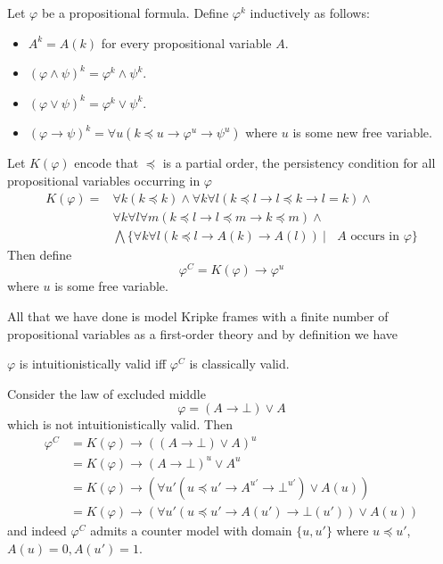 \documentclass[a4paper,UKenglish,cleveref, autoref, thm-restate]{lipics-v2021}
\begin{document}
\begin{definition}
	Let $\varphi$ be a propositional formula. Define $\varphi^{k}$ inductively as follows:
	\begin{itemize}
		\item $A^{k} = A(k)$ for every propositional variable $A$.
		\item $(\varphi\wedge\psi)^k = \varphi^k\wedge\psi^k$.
		\item $(\varphi\vee\psi)^k = \varphi^k\vee\psi^k$.
		\item $(\varphi\to \psi)^k = \forall u(k\preceq u\to\varphi^{u}\to\psi^{u})$ where $u$ is some new free variable.
	\end{itemize}
	Let $K(\varphi)$ encode that $\preceq$ is a partial order, the persistency condition for all propositional variables occurring in $\varphi$
	\begin{align*}
		K(\varphi) = &\forall k(k\preceq k)\wedge \forall k\forall l(k\preceq l\to l\preceq k\to l = k) \wedge \\&\forall k\forall l\forall m(k\preceq l \to l\preceq m\to k\preceq m)\wedge\\&\bigwedge \{\forall k\forall l(k\preceq l\to A(k)\to A(l))\:|\: \text{ $A$ occurs in $\varphi$}\}
	\end{align*}
	Then define
	$$\varphi^{C} = K(\varphi)\to \varphi^{u}$$
	where $u$ is some free variable.
\end{definition}

All that we have done is model Kripke frames with a finite number of propositional variables as a first-order theory and by definition we have

\begin{lemma}
	$\varphi$ is intuitionistically valid iff $\varphi^C$ is classically valid.
\end{lemma}

\begin{example}
	Consider the law of excluded middle $$\varphi = (A\to \bot)\vee A$$ which is not intuitionistically valid. Then
	\begin{align*}
		\varphi^{C} &= K(\varphi)\to ((A\to \bot)\vee A)^u\\
		&= K(\varphi)\to (A\to \bot)^u\vee A^u\\
		&= K(\varphi)\to (\forall u'( u\preceq u' \to A^{u'}\to \bot^{u'})\vee A(u))\\
		&= K(\varphi)\to (\forall u' (u\preceq u' \to A(u')\to \bot(u'))\vee A(u))
	\end{align*}
	and indeed $\varphi^{C}$ admits a counter model with domain $\{u, u'\}$ where $u \preceq u'$, $A(u) = 0, A(u') = 1$.
\end{example}
\end{document}
